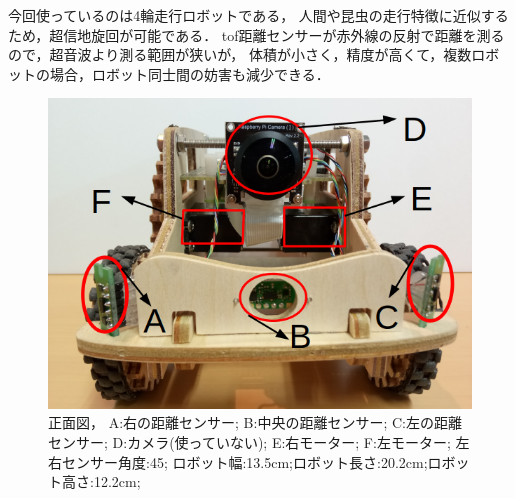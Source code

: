 今回使っているのは4輪走行ロボットである，
人間や昆虫の走行特徴に近似するため，超信地旋回が可能である．
tof距離センサーが赤外線の反射で距離を測るので，超音波より測る範囲が狭いが，
体積が小さく，精度が高くて，複数ロボットの場合，ロボット同士間の妨害も減少できる．
\begin{figure}[h]
        \centering
        \includegraphics[width=0.9\linewidth]{robot1.jpg}
        \caption{正面図， A:右の距離センサー;
                 B:中央の距離センサー;
                 C:左の距離センサー;
                 D:カメラ(使っていない);
                 E:右モーター;
                 F:左モーター;
                 左右センサー角度:45\degree;
                 ロボット幅:13.5cm;ロボット長さ:20.2cm;ロボット高さ:12.2cm;
        }
\end{figure}



